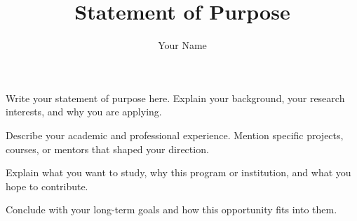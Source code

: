 \documentclass{article}
\title{Statement of Purpose}
\author{Your Name}
\date{}
\begin{document}
\maketitle

\noindent Write your statement of purpose here. Explain your background,
your research interests, and why you are applying.

Describe your academic and professional experience. Mention specific
projects, courses, or mentors that shaped your direction.

Explain what you want to study, why this program or institution, and
what you hope to contribute.

Conclude with your long-term goals and how this opportunity fits into them.
\end{document}

